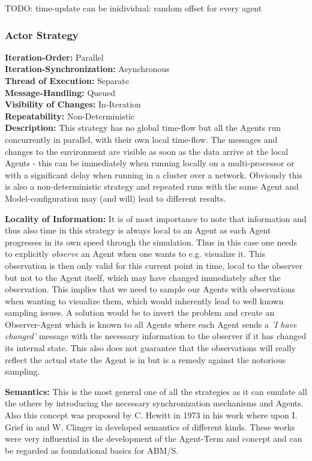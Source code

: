 TODO: time-update can be inidividual: random offset for every agent


\subsubsection{Actor Strategy}
\textbf{Iteration-Order:} Parallel \\
\textbf{Iteration-Synchronization:}	Asynchronous \\
\textbf{Thread of Execution:} Separate \\
\textbf{Message-Handling:} Queued \\
\textbf{Visibility of Changes:}	In-Iteration \\
\textbf{Repeatability:}	Non-Deterministic \\

\textbf{Description:} This strategy has no global time-flow but all the Agents run concurrently in parallel, with their own local time-flow. The messages and changes to the environment are visible as soon as the data arrive at the local Agents - this can be immediately when running locally on a multi-processor or with a significant delay when running in a cluster over a network. Obviously this is also a non-deterministic strategy and repeated runs with the same Agent and Model-configuration may (and will) lead to different results.

\textbf{Locality of Information:} It is of most importance to note that information and thus also time in this strategy is always local to an Agent as each Agent progresses in its own speed through the simulation. Thus in this case one needs to explicitly \textit{observe} an Agent when one wants to e.g. visualize it. This observation is then only valid for this current point in time, local to the observer but not to the Agent itself, which may have changed immediately after the observation. This implies that we need to sample our Agents with observations when wanting to visualize them, which would inherently lead to well known sampling issues. A solution would be to invert the problem and create an Observer-Agent which is known to all Agents where each Agent sends a \textit{'I have changed'} message with the necessary information to the observer if it has changed its internal state. This also does not guarantee that the observations will really reflect the actual state the Agent is in but is a remedy against the notorious sampling. 

\textbf{Semantics:} This is the most general one of all the strategies as it can emulate all the others by introducing the necessary synchronization mechanisms and Agents. Also this concept was proposed by C. Hewitt in 1973 in his work \cite{hewitt_universal_1973} where upon I. Grief in \cite{grief_semantics_1975} and W. Clinger in \cite{clinger_foundations_1981} developed semantics of different kinds. These works were very influential in the development of the Agent-Term and concept and can be regarded as foundational basics for ABM/S.